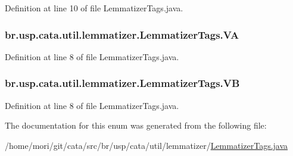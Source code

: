 Definition at line 10 of file Lemmatizer\+Tags.\+java.

\hypertarget{enumbr_1_1usp_1_1cata_1_1util_1_1lemmatizer_1_1_lemmatizer_tags_a14c9a105de951a8279b6a61d6d2d4a3f}{
\subsubsection[{V\+A}]{\setlength{\rightskip}{0pt plus 5cm}br.\+usp.\+cata.\+util.\+lemmatizer.\+Lemmatizer\+Tags.\+V\+A}}\label{enumbr_1_1usp_1_1cata_1_1util_1_1lemmatizer_1_1_lemmatizer_tags_a14c9a105de951a8279b6a61d6d2d4a3f}


Definition at line 8 of file Lemmatizer\+Tags.\+java.

\hypertarget{enumbr_1_1usp_1_1cata_1_1util_1_1lemmatizer_1_1_lemmatizer_tags_a95f129d76ab5b23f65b13ceeb9fcd749}{
\subsubsection[{V\+B}]{\setlength{\rightskip}{0pt plus 5cm}br.\+usp.\+cata.\+util.\+lemmatizer.\+Lemmatizer\+Tags.\+V\+B}}\label{enumbr_1_1usp_1_1cata_1_1util_1_1lemmatizer_1_1_lemmatizer_tags_a95f129d76ab5b23f65b13ceeb9fcd749}


Definition at line 8 of file Lemmatizer\+Tags.\+java.



The documentation for this enum was generated from the following file\+:\begin{DoxyCompactItemize}
\item 
/home/mori/git/cata/src/br/usp/cata/util/lemmatizer/\hyperlink{_lemmatizer_tags_8java}{Lemmatizer\+Tags.\+java}\end{DoxyCompactItemize}
